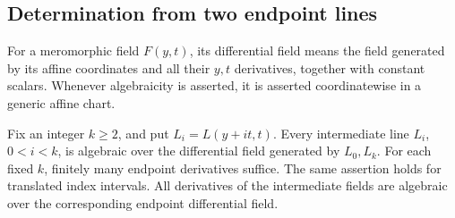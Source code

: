 \subsection{Determination from two endpoint lines}

For a meromorphic field \(F(y,t)\), its differential field
means the field generated by its affine coordinates and all their
\(y,t\) derivatives, together with constant scalars.  Whenever
algebraicity is asserted, it is asserted coordinatewise in a
generic affine chart.

\begin{theorem}
\label{thm:lens-lines}
Fix an integer \(k\ge2\), and put \(L_i=L(y+it,t)\).
Every intermediate line \(L_i\), \(0<i<k\), is algebraic over
the differential field generated by \(L_0,L_k\).
For each fixed \(k\), finitely many endpoint derivatives suffice.
The same assertion holds for translated index intervals.
All derivatives of the intermediate fields are algebraic over
the corresponding endpoint differential field.
\end{theorem}

